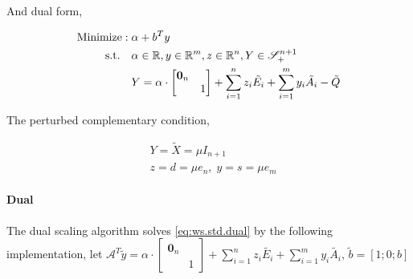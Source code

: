 \documentclass[../main]{subfiles}
\begin{document}
And dual form,

\begin{equation} \label{eq:ws.std.dual}
    \begin{aligned}
        \mathrm{Minimize:\;}           & \alpha + b^Ty                                                                           \\
        \mathrm{s.t.} \quad & \alpha \in \mathbb{R}, y \in \mathbb{R}^m, z\in \mathbb{R}^n, Y  \in \mathscr S^{n+1}_+ \\
                            & Y =\alpha \cdot \begin{bmatrix}  \bm 0_n &  \\  & 1  \end{bmatrix}
        + \sum_{i=1}^{n} z_{i} \tilde{E_i}
        + \sum_{i=1}^{m} y_{i} \tilde{A_i}
        - \tilde{Q}
    \end{aligned}
\end{equation}

The perturbed complementary condition,

\begin{equation} \label{eq:ws.std.lc}
    \begin{aligned}
         & Y = \tilde X = \mu I_{n+1}           \\
         & z = d =  \mu e_n, \; y = s = \mu e_m
    \end{aligned}
\end{equation}



\paragraph{Dual}
The dual scaling algorithm \cite{benson_solving_2000} solves \eqref{eq:ws.std.dual} by the following implementation,
let \(\mathcal{A}^T \tilde y = \alpha \cdot \begin{bmatrix}  \bm 0_n &  \\  & 1  \end{bmatrix}
+ \sum_{i=1}^{n} z_{i} \tilde{E_i}
+ \sum_{i=1}^{m} y_{i} \tilde{A_i}\), \(\tilde b = [1; 0; b]\)
\end{document}
